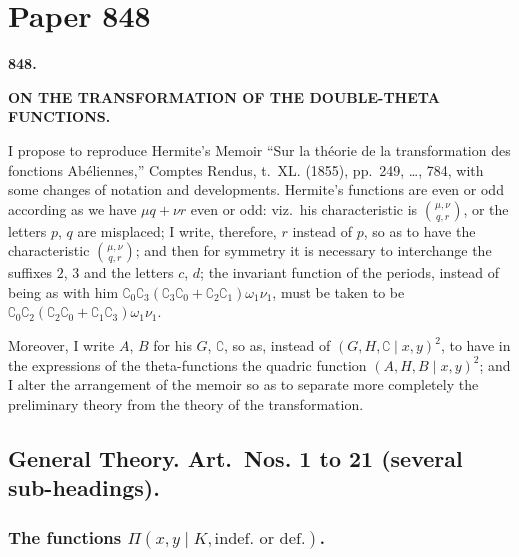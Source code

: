 \documentclass[11pt,a4paper]{article}
\theoremstyle{definition}
\begin{document}
\section{Paper 848}

\begin{center}
\large\textbf{848.}

\Large\textbf{ON THE TRANSFORMATION OF THE DOUBLE-THETA FUNCTIONS.}

\end{center}

\bigskip

I propose to reproduce Hermite's Memoir ``Sur la th\'{e}orie de la transformation des fonctions Ab\'{e}liennes,'' Comptes Rendus, t.~XL. (1855), pp.~249, \ldots, 784, with some changes of notation and developments. Hermite's functions are even or odd according as we have $\mu q + \nu r$ even or odd: viz.\ his characteristic is $\binom{\mu, \nu}{q, r}$, or the letters $p$, $q$ are misplaced; I write, therefore, $r$ instead of $p$, so as to have the characteristic $\binom{\mu, \nu}{q, r}$; and then for symmetry it is necessary to interchange the suffixes $2$, $3$ and the letters $c$, $d$; the invariant function of the periods, instead of being as with him $\complement_0\complement_3(\complement_3\complement_0 + \complement_2\complement_1)\omega_1\nu_1$, must be taken to be $\complement_0\complement_2(\complement_2\complement_0 + \complement_1\complement_3)\omega_1\nu_1$.

Moreover, I write $A$, $B$ for his $G$, $\complement$, so as, instead of $(G, H, \complement \mid x, y)^2$, to have in the expressions of the theta-functions the quadric function $(A, H, B \mid x, y)^2$; and I alter the arrangement of the memoir so as to separate more completely the preliminary theory from the theory of the transformation.

\subsection*{General Theory. Art.~Nos. 1 to 21 (several sub-headings).}

\subsubsection*{The functions $\Pi(x, y \mid K, \text{indef.\ or def.})$.}
\end{document}
